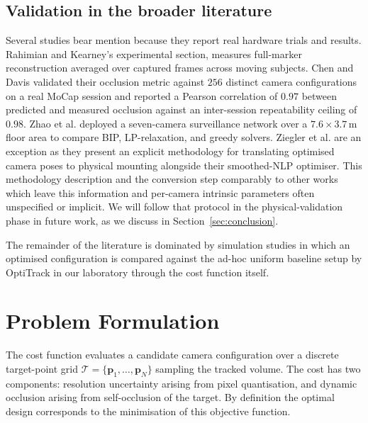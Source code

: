 \documentclass[conference]{IEEEtran}
\begin{document}
\subsection{Validation in the broader literature}
Several studies bear mention because they report real hardware trials and results. Rahimian and Kearney's experimental section, measures full-marker reconstruction averaged over captured frames across moving subjects. Chen and Davis \cite{chen_occlusion_2008} validated their occlusion metric against $256$ distinct camera configurations on a real MoCap session and reported a Pearson correlation of $0.97$ between predicted and measured occlusion against an inter-session repeatability ceiling of $0.98$. Zhao et al. \cite{zhao_approximate_2013} deployed a seven-camera surveillance network over a $7.6\!\times\!3.7\,\text{m}$ floor area to compare BIP, LP-relaxation, and greedy solvers. Ziegler et al. \cite{ziegler_optimal_2023} are an exception as they present an explicit methodology for translating optimised camera poses to physical mounting alongside their smoothed-NLP optimiser. This methodology description and the conversion step comparably to other works which leave this information and per-camera intrinsic parameters often unspecified or implicit. We will follow that protocol in the physical-validation phase in future work, as we discuss in Section~\ref{sec:conclusion}.

The remainder of the literature is dominated by simulation studies in which an optimised configuration is compared against the ad-hoc uniform baseline setup by OptiTrack in our laboratory through the cost function itself.

\section{Problem Formulation}
\label{sec:formulation}
The cost function evaluates a candidate camera configuration over a discrete target-point grid $\mathcal{T} = \{\mathbf{p}_1, \ldots, \mathbf{p}_N\}$ sampling the tracked volume. The cost has two components: resolution uncertainty arising from pixel quantisation, and dynamic occlusion arising from self-occlusion of the target. By definition the optimal design corresponds to the minimisation of this objective function.
\end{document}
